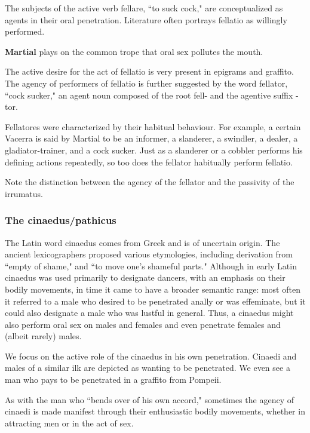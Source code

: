 The subjects of the active verb fellare, ``to suck cock," are conceptualized as agents in their oral penetration. Literature often portrays fellatio as willingly performed. 

\begin{rmk}
    \textbf{Martial} plays on the common trope that oral sex pollutes the mouth.
\end{rmk}

The active desire for the act of fellatio is very present in epigrams and graffito. The agency of performers of fellatio is further suggested by the word fellator, ``cock sucker," an agent noun composed of the root fell- and the agentive suffix -tor.

Fellatores were characterized by their habitual behaviour. For example, a certain Vacerra is said by Martial to be an informer, a slanderer, a swindler, a dealer, a gladiator-trainer, and a cock sucker. Just as a slanderer or a cobbler performs his defining actions repeatedly, so too does the fellator habitually perform fellatio.

Note the distinction between the agency of the fellator and the passivity of the irrumatus.

\subsubsection{The cinaedus/pathicus}

The Latin word cinaedus comes from Greek and is of uncertain origin. The ancient lexicographers proposed various etymologies, including derivation from ``empty of shame," and ``to move one's shameful parts." Although in early Latin cinaedus was used primarily to designate dancers, with an emphasis on their bodily movements, in time it came to have a broader semantic range: most often it referred to a male who desired to be penetrated anally or was effeminate, but it could also designate a male who was lustful in general. Thus, a cinaedus might also perform oral sex on males and females and even penetrate females and (albeit rarely) males.

We focus on the active role of the cinaedus in his own penetration. Cinaedi and males of a similar ilk are depicted as wanting to be penetrated. We even see a man who pays to be penetrated in a graffito from Pompeii.

As with the man who ``bends over of his own accord," sometimes the agency of cinaedi is made manifest through their enthusiastic bodily movements, whether in attracting men or in the act of sex.


